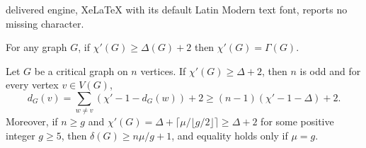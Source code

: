 \documentclass[10pt,a4paper]{amsart}
\begin{document}
delivered engine, XeLaTeX with its default Latin Modern text font, reports no missing character.
\begin{theorem}\label{Thm-CJZ}
For any graph $G$, if $\chi'(G) \ge \Delta(G) +2$ then $\chi'(G) = \Gamma(G)$. \end{theorem}

\begin{lemma} \label{critical}
    Let $G$ be a critical graph on $n$ vertices. If  $\chi'(G) \geq \Delta + 2$,
    then $n$ is odd and for every vertex $v\in V(G)$,
    $$d_{G}(v) = \sum_{w\ne v} (\chi' -1 -d_G(w)) +2  \ge (n-1)(\chi' -1 -\Delta) +2.$$
Moreover, if $n \ge g$ and $\chi'(G) = \Delta + \lceil \mu/\lfloor g/2 \rfloor\rceil \ge \Delta +2$ for some positive integer $g \ge 5$, then
    \( \delta(G) \ge  n\mu/g +1\), and  equality holds only if $\mu =g$.
    \end{lemma}
\end{document}
